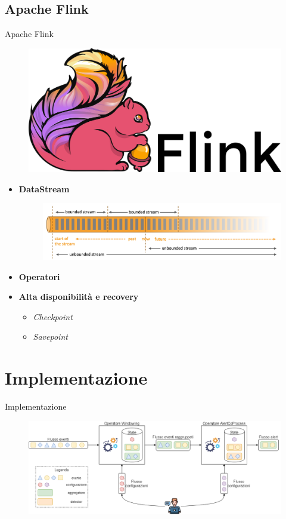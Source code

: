 \documentclass{beamer}
\begin{document}
	\subsection{Apache Flink}
	\begin{frame}{Apache Flink}
		\begin{figure}[!h] 
    		\centering 
    		\includegraphics[width=0.27\columnwidth]{../immagini/slide/Apache_Flink_logo.png}
		\end{figure}
		
		\begin{itemize}
			\item \textbf{DataStream}
				\begin{figure}[!h] 
    		\centering 
    		\includegraphics[width=0.8\columnwidth]{../immagini/slide/bounded-unbounded.png} 
		\end{figure}  \vspace{.5em}
			
			\item \textbf{Operatori}  \vspace{.5em}
			\item \textbf{Alta disponibilità e recovery}
			\begin{itemize}
				\item \textit{Checkpoint} \vspace{.5em}
				\item \textit{Savepoint} \vspace{.5em}
				\end{itemize} \vspace{.5em}
		\end{itemize}
	\end{frame}
	
	\section{Implementazione}

	\begin{frame}{Implementazione}
		\begin{figure}[!h]
    		 \centering
    		\includegraphics[width=11.5cm]{../immagini/slide/implementation.png}
		\end{figure}
	\end{frame}
	
\end{document}
